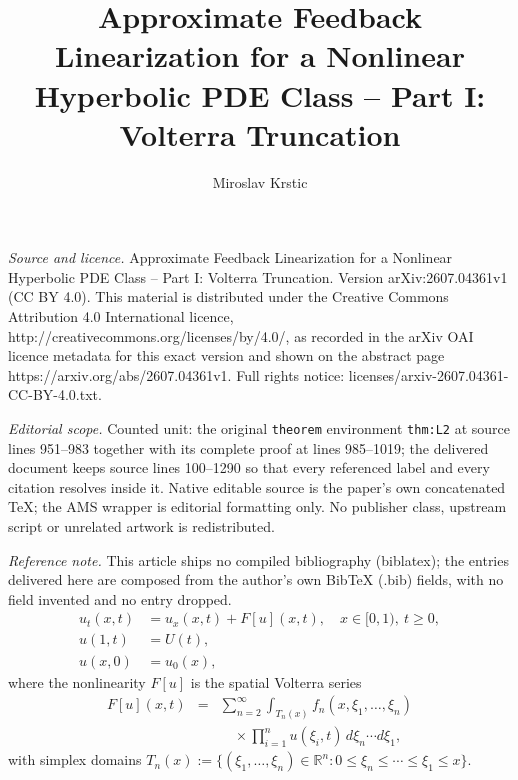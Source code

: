 \documentclass[10pt,a4paper]{amsart}
\newcommand{\R}{\mathbb{R}}
\begin{document}
\title[Approximate Feedback Linearization for a Nonlinear Hyperboli]{Approximate Feedback Linearization for a Nonlinear Hyperbolic PDE Class -- Part I: Volterra Truncation}
\author{Miroslav Krstic}
\date{}
\maketitle
\noindent\emph{Source and licence.} Approximate Feedback Linearization for a Nonlinear Hyperbolic PDE Class -- Part I: Volterra Truncation. Version arXiv:2607.04361v1 (CC BY 4.0). This material is distributed under the Creative Commons Attribution 4.0 International licence, http://creativecommons.org/licenses/by/4.0/, as recorded in the arXiv OAI licence metadata for this exact version and shown on the abstract page https://arxiv.org/abs/2607.04361v1. Full rights notice: licenses/arxiv-2607.04361-CC-BY-4.0.txt.\par\smallskip
\noindent\textit{Editorial scope.} Counted unit: the original \texttt{theorem} environment \texttt{thm:L2} at source lines 951--983 together with its complete proof at lines 985--1019; the delivered document keeps source lines 100--1290 so that every referenced label and every citation resolves inside it. Native editable source is the paper's own concatenated TeX; the AMS wrapper is editorial formatting only. No publisher class, upstream script or unrelated artwork is redistributed.
\par\smallskip\noindent\textit{Reference note.} This article ships no compiled bibliography (biblatex); the entries delivered here are composed from the author's own BibTeX (.bib) fields, with no field invented and no entry dropped.
\begin{align}
u_t(x,t) &= u_x(x,t) + F[u](x,t), \quad x \in [0,1), \ t \ge 0, \label{eq:plant} \\
u(1,t) &= U(t), \label{eq:plant_bdy}\\
u(x,0) &= u_0(x), \label{eq:plant_ic}
\end{align}
where the nonlinearity $F[u]$ is the spatial Volterra series
\begin{eqnarray}
F[u](x,t) &=& \sum_{n=2}^\infty \int_{T_n(x)} f_n(x,\xi_1,\ldots,\xi_n) \nonumber \\
&& \quad \times \prod_{i=1}^n u(\xi_i,t)\, d\xi_n \cdots d\xi_1,
\label{eq:Fdef}
\end{eqnarray}
with simplex domains $T_n(x) := \{(\xi_1,\ldots,\xi_n) \in \R^n : 0 \le \xi_n \le \cdots \le \xi_1 \le x\}$.
\end{document}

